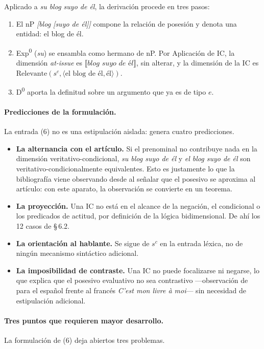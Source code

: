 \documentclass[12pt,a4paper]{article}
\newcommand{\sem}[1]{\ensuremath{\llbracket #1 \rrbracket}}
\begin{document}
Aplicado a \textit{su blog suyo de él}, la derivación procede en tres pasos:
\begin{enumerate}[label=\arabic*.,leftmargin=1.8em]
\item El nP \textit{[blog [suyo de él]]} compone la relación de posesión y denota una entidad: el blog de él.
\item Exp\textsuperscript{0} (\textit{su}) se ensambla como hermano de nP. Por Aplicación de IC, la dimensión \textit{at-issue} es $\sem{\textit{blog suyo de él}}$, sin alterar, y la dimensión de la IC es $\text{Relevante}(s^c, \langle \text{el blog de él}, \text{él} \rangle)$.
\item D\textsuperscript{0} aporta la definitud sobre un argumento que ya es de tipo $e$.
\end{enumerate}

\paragraph{Predicciones de la formulación.} La entrada (6) no es una estipulación aislada: genera cuatro predicciones.
\begin{itemize}[leftmargin=2em]
\item \textbf{La alternancia con el artículo.} Si el prenominal no contribuye nada en la dimensión veritativo-condicional, \textit{su blog suyo de él} y \textit{el blog suyo de él} son veritativo-condicionalmente equivalentes. Esto es justamente lo que la bibliografía viene observando desde \textcite{companycompany2001} al señalar que el posesivo se aproxima al artículo: con este aparato, la observación se convierte en un teorema.
\item \textbf{La proyección.} Una IC no está en el alcance de la negación, el condicional o los predicados de actitud, por definición de la lógica bidimensional. De ahí los 12 casos de \S\,6.2.
\item \textbf{La orientación al hablante.} Se sigue de $s^c$ en la entrada léxica, no de ningún mecanismo sintáctico adicional.
\item \textbf{La imposibilidad de contraste.} Una IC no puede focalizarse ni negarse, lo que explica que el posesivo evaluativo no sea contrastivo ---observación de \textcite{eguren2016} para el español frente al francés \textit{C'est mon livre à moi}--- sin necesidad de estipulación adicional.
\end{itemize}

\paragraph{Tres puntos que requieren mayor desarrollo.} La formulación de (6) deja abiertos tres problemas.
\end{document}
